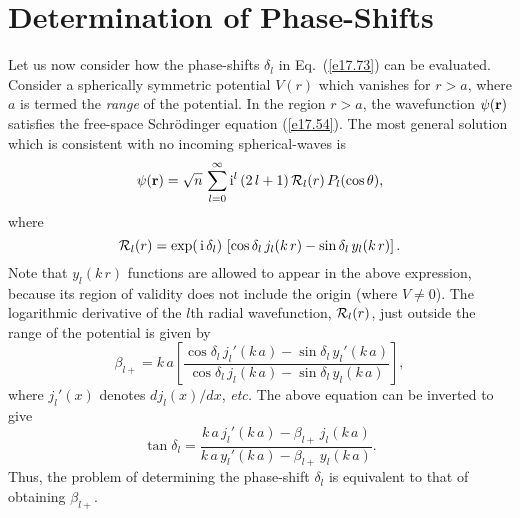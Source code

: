 \section{Determination of Phase-Shifts}
Let us now consider how the phase-shifts $\delta_l$ in Eq.~(\ref{e17.73}) can be
 evaluated. Consider a spherically symmetric potential $V(r)$ which
vanishes for $r>a$, where $a$ is termed the {\em range}\/ of the potential.
In the region $r>a$, the wavefunction $\psi({\bf r})$ 
satisfies the free-space Schr\"{o}dinger equation (\ref{e17.54}). The
most general solution which is consistent with no incoming spherical-waves is
\begin{equation}
\psi({\bf r}) = \sqrt{n}\, \sum_{l=0}^\infty
{\rm i}^l\, (2\,l+1) \, {\cal R}_l(r)\, P_l(\cos\theta),
\end{equation}
where
\begin{equation}\label{e17.80}
{\cal R}_l(r) = \exp(\,{\rm i} \,\delta_l)\,
\left[\cos\delta_l \,j_l(k\,r) -\sin\delta_l\, y_l(k\,r)\right].
\end{equation}
Note that  $y_l(k\,r)$ functions are allowed to appear in the above
expression, because its region of validity does not include the origin
(where $V\neq 0$). The logarithmic derivative of the $l$th 
radial wavefunction,
${\cal R}_l(r)$, just outside the range of the potential is given by
\begin{equation}
\beta_{l+} = k\,a \left[\frac{ \cos\delta_l\,j_l'(k\,a) -
\sin\delta_l\, y_l'(k\,a)}{\cos\delta_l \,
j_l(k\,a) - \sin\delta_l\,y_l(k\,a)}\right],
\end{equation}
where $j_l'(x)$ denotes $dj_l(x)/dx$, {\em etc.} The above equation
can be inverted to give
\begin{equation}\label{e17.82}
\tan \delta_l = \frac{ k\,a\,j_l'(k\,a) - \beta_{l+}\, j_l(k\,a)}
{k\,a\,y_l'(k\,a) - \beta_{l+}\, y_l(k\,a)}.
\end{equation}
Thus, the problem of determining the phase-shift $\delta_l$ is equivalent
to that of obtaining $\beta_{l+}$. 

